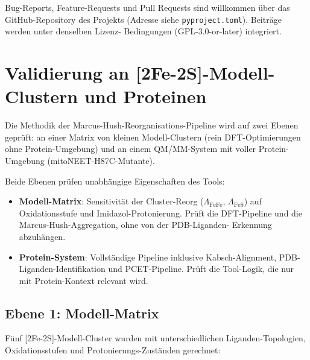\documentclass[11pt,a4paper,twoside]{article}
\theoremstyle{remark}
\begin{document}
Bug-Reports, Feature-Requests und Pull Requests sind willkommen \"uber
das GitHub-Repository des Projekts (Adresse siehe
\texttt{pyproject.toml}). Beitr\"age werden unter denselben Lizenz-
Bedingungen (GPL-3.0-or-later) integriert.


\section{Validierung an [2Fe-2S]-Modell-Clustern und Proteinen}
\label{sec:validierung}

Die Methodik der Marcus-Hush-Reorganisations-Pipeline wird auf zwei
Ebenen gepr\"uft: an einer Matrix von kleinen Modell-Clustern (rein
DFT-Optimierungen ohne Protein-Umgebung) und an einem
QM/MM-System mit voller Protein-Umgebung (mitoNEET-H87C-Mutante).

Beide Ebenen pr\"ufen unabh\"angige Eigenschaften des Tools:

\begin{itemize}
  \item \textbf{Modell-Matrix}: Sensitivit\"at der Cluster-Reorg
        ($\Lambda_\text{FeFe}$, $\Lambda_\text{FeS}$) auf Oxidationsstufe und
        Imidazol-Protonierung. Pr\"uft die DFT-Pipeline und die
        Marcus-Hush-Aggregation, ohne von der PDB-Liganden-
        Erkennung abzuh\"angen.
  \item \textbf{Protein-System}: Vollst\"andige Pipeline inklusive
        Kabsch-Alignment, PDB-Liganden-Identifikation und
        PCET-Pipeline. Pr\"uft die Tool-Logik, die nur mit
        Protein-Kontext relevant wird.
\end{itemize}

\subsection{Ebene 1: Modell-Matrix}
\label{sec:val-modell-matrix}

F\"unf [2Fe-2S]-Modell-Cluster wurden mit unterschiedlichen
Liganden-Topologien, Oxidationsstufen und Protonierungs-Zust\"anden
gerechnet:
\end{document}
